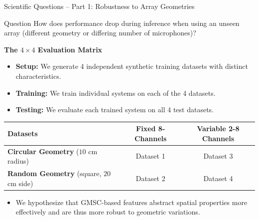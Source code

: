 \documentclass[8pt,hyperref={pdfpagelabels=true},xcolor=table,aspectratio=169]{beamer}
\begin{document}
\begin{frame}{Scientific Questions -- Part 1: Robustness to Array Geometries}
    \begin{block}{Question}
        How does performance drop during inference when using an unseen array (different geometry or differing number of microphones)?
    \end{block}
    \vspace{1em}
    \textbf{The $4 \times 4$ Evaluation Matrix}
    \begin{itemize}
        \item \textbf{Setup:} We generate 4 independent synthetic training datasets with distinct characteristics.
        \item \textbf{Training:} We train individual systems on each of the 4 datasets.
        \item \textbf{Testing:} We evaluate each trained system on all 4 test datasets.
    \end{itemize}
    \vspace{1em}
    \begin{center}
        \begin{tabular}{l|c|c}
            \toprule
            \textbf{Datasets} & \textbf{Fixed 8-Channels} & \textbf{Variable 2-8 Channels} \\
            \midrule
            \textbf{Circular Geometry} ($10$ cm radius)      & Dataset 1                 & Dataset 3                      \\
            \textbf{Random Geometry} (square, $20$ cm side)       & Dataset 2                 & Dataset 4                      \\
            \bottomrule
        \end{tabular}
    \end{center}
    \begin{itemize}
        \item We hypothesize that GMSC-based features abstract spatial properties more effectively
        and are thus more robust to geometric variations.
    \end{itemize}
\end{frame}
\end{document}
